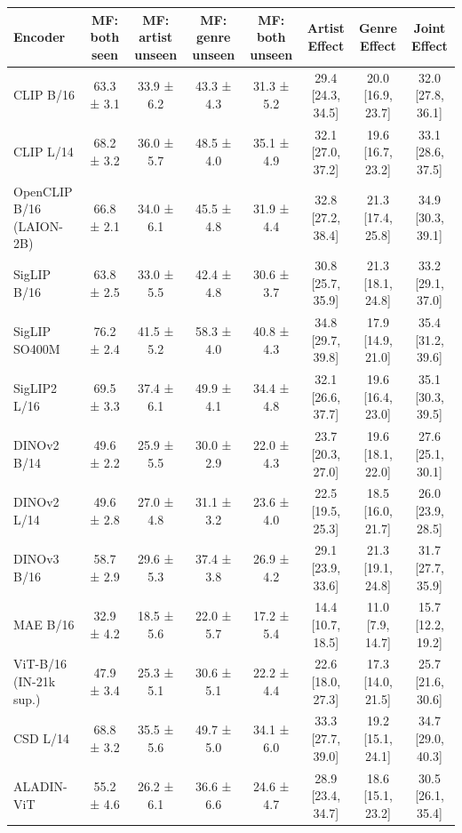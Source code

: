 \begin{tabular}{lccccccc}
\toprule
Encoder & MF: both seen & MF: artist unseen & MF: genre unseen & MF: both unseen & Artist Effect & Genre Effect & Joint Effect \\
\midrule
CLIP B/16 & 63.3 ± 3.1 & 33.9 ± 6.2 & 43.3 ± 4.3 & 31.3 ± 5.2 & 29.4 [24.3, 34.5] & 20.0 [16.9, 23.7] & 32.0 [27.8, 36.1] \\
CLIP L/14 & 68.2 ± 3.2 & 36.0 ± 5.7 & 48.5 ± 4.0 & 35.1 ± 4.9 & 32.1 [27.0, 37.2] & 19.6 [16.7, 23.2] & 33.1 [28.6, 37.5] \\
OpenCLIP B/16 (LAION-2B) & 66.8 ± 2.1 & 34.0 ± 6.1 & 45.5 ± 4.8 & 31.9 ± 4.4 & 32.8 [27.2, 38.4] & 21.3 [17.4, 25.8] & 34.9 [30.3, 39.1] \\
SigLIP B/16 & 63.8 ± 2.5 & 33.0 ± 5.5 & 42.4 ± 4.8 & 30.6 ± 3.7 & 30.8 [25.7, 35.9] & 21.3 [18.1, 24.8] & 33.2 [29.1, 37.0] \\
SigLIP SO400M & 76.2 ± 2.4 & 41.5 ± 5.2 & 58.3 ± 4.0 & 40.8 ± 4.3 & 34.8 [29.7, 39.8] & 17.9 [14.9, 21.0] & 35.4 [31.2, 39.6] \\
SigLIP2 L/16 & 69.5 ± 3.3 & 37.4 ± 6.1 & 49.9 ± 4.1 & 34.4 ± 4.8 & 32.1 [26.6, 37.7] & 19.6 [16.4, 23.0] & 35.1 [30.3, 39.5] \\
DINOv2 B/14 & 49.6 ± 2.2 & 25.9 ± 5.5 & 30.0 ± 2.9 & 22.0 ± 4.3 & 23.7 [20.3, 27.0] & 19.6 [18.1, 22.0] & 27.6 [25.1, 30.1] \\
DINOv2 L/14 & 49.6 ± 2.8 & 27.0 ± 4.8 & 31.1 ± 3.2 & 23.6 ± 4.0 & 22.5 [19.5, 25.3] & 18.5 [16.0, 21.7] & 26.0 [23.9, 28.5] \\
DINOv3 B/16 & 58.7 ± 2.9 & 29.6 ± 5.3 & 37.4 ± 3.8 & 26.9 ± 4.2 & 29.1 [23.9, 33.6] & 21.3 [19.1, 24.8] & 31.7 [27.7, 35.9] \\
MAE B/16 & 32.9 ± 4.2 & 18.5 ± 5.6 & 22.0 ± 5.7 & 17.2 ± 5.4 & 14.4 [10.7, 18.5] & 11.0 [7.9, 14.7] & 15.7 [12.2, 19.2] \\
ViT-B/16 (IN-21k sup.) & 47.9 ± 3.4 & 25.3 ± 5.1 & 30.6 ± 5.1 & 22.2 ± 4.4 & 22.6 [18.0, 27.3] & 17.3 [14.0, 21.5] & 25.7 [21.6, 30.6] \\
CSD L/14 & 68.8 ± 3.2 & 35.5 ± 5.6 & 49.7 ± 5.0 & 34.1 ± 6.0 & 33.3 [27.7, 39.0] & 19.2 [15.1, 24.1] & 34.7 [29.0, 40.3] \\
ALADIN-ViT & 55.2 ± 4.6 & 26.2 ± 6.1 & 36.6 ± 6.6 & 24.6 ± 4.7 & 28.9 [23.4, 34.7] & 18.6 [15.1, 23.2] & 30.5 [26.1, 35.4] \\
\bottomrule
\end{tabular}
